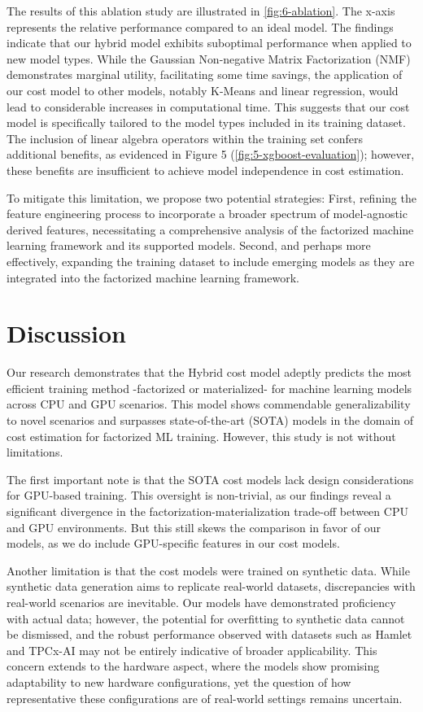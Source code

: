The results of this ablation study are illustrated in \autoref{fig:6-ablation}. The x-axis represents the relative performance compared to an ideal model. The findings indicate that our hybrid model exhibits suboptimal performance when applied to new model types. While the Gaussian Non-negative Matrix Factorization (NMF) demonstrates marginal utility, facilitating some time savings, the application of our cost model to other models, notably K-Means and linear regression, would lead to considerable increases in computational time. This suggests that our cost model is specifically tailored to the model types included in its training dataset. The inclusion of linear algebra operators within the training set confers additional benefits, as evidenced in Figure 5 (\autoref{fig:5-xgboost-evaluation}); however, these benefits are insufficient to achieve model independence in cost estimation.

To mitigate this limitation, we propose two potential strategies: First, refining the feature engineering process to incorporate a broader spectrum of model-agnostic derived features, necessitating a comprehensive analysis of the factorized machine learning framework and its supported models. Second, and perhaps more effectively, expanding the training dataset to include emerging models as they are integrated into the factorized machine learning framework.

\section{Discussion}
\label{sec:eval-discussion}
Our research demonstrates that the Hybrid cost model adeptly predicts the most efficient training method -factorized or materialized- for machine learning models across CPU and GPU scenarios. This model shows commendable generalizability to novel scenarios and surpasses state-of-the-art (SOTA) models in the domain of cost estimation for factorized ML training. However, this study is not without limitations.

The first important note is that the SOTA cost models lack design considerations for GPU-based training. This oversight is non-trivial, as our findings reveal a significant divergence in the factorization-materialization trade-off between CPU and GPU environments. But this still skews the comparison in favor of our models, as we do include GPU-specific features in our cost models.

Another limitation is that the cost models were trained on synthetic data. While synthetic data generation aims to replicate real-world datasets, discrepancies with real-world scenarios are inevitable.  Our models have demonstrated proficiency with actual data; however, the potential for overfitting to synthetic data cannot be dismissed, and the robust performance observed with datasets such as Hamlet and TPCx-AI may not be entirely indicative of broader applicability. This concern extends to the hardware aspect, where the models show promising adaptability to new hardware configurations, yet the question of how representative these configurations are of real-world settings remains uncertain.

